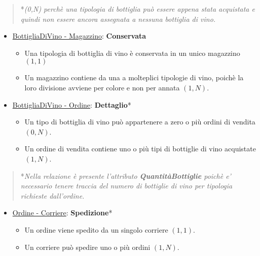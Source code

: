 \begin{verse}
	*\emph{(0,N) perchè una tipologia di bottiglia può essere appena stata acquistata e quindi non essere ancora assegnata a nessuna bottiglia di vino.}
\end{verse}

\begin{itemize}
	\item \underline{BottigliaDiVino - Magazzino}: \textbf{Conservata}
	
	\begin{itemize}
		\item Una tipologia di bottiglia di vino è conservata in un unico magazzino $(1,1)$
		\item Un magazzino contiene da una a molteplici tipologie di vino, poichè la loro divisione avviene per colore e non per annata $(1,N)$.
	\end{itemize}
	
\end{itemize}

\begin{itemize}
	\item \underline{BottigliaDiVino - Ordine}: \textbf{Dettaglio}*
	
	\begin{itemize}
		\item Un tipo di bottiglia di vino può appartenere a zero o più ordini di vendita $(0,N)$.
		\item Un ordine di vendita contiene uno o più tipi di bottiglie di vino acquistate $(1,N)$.
	\end{itemize}
	
\end{itemize}

\begin{verse}
	*\emph{Nella relazione è presente l'attributo \textbf{QuantitàBottiglie} poichè e' necessario tenere traccia del numero di bottiglie di vino per tipologia richieste dall'ordine.}
\end{verse}

\begin{itemize}
	\item \underline{Ordine - Corriere}: \textbf{Spedizione}*
	
	\begin{itemize}
		\item Un ordine viene spedito da un singolo corriere $(1,1)$.
		\item Un corriere può spedire uno o più ordini $(1,N)$.
	\end{itemize}
	
\end{itemize}

